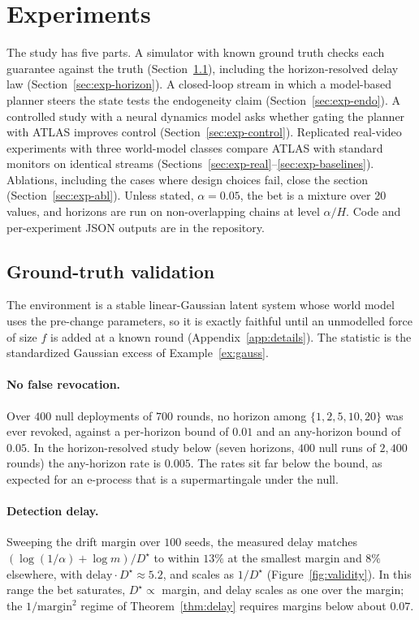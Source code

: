 \section{Experiments}\label{sec:experiments}

The study has five parts. A simulator with known ground truth checks each guarantee against the truth (Section~\ref{sec:exp-synth}), including
the horizon-resolved delay law (Section~\ref{sec:exp-horizon}). A closed-loop stream in which a model-based planner steers the state tests the endogeneity claim
(Section~\ref{sec:exp-endo}). A controlled study with a neural dynamics model asks whether gating the planner with ATLAS improves control (Section~\ref{sec:exp-control}).
Replicated real-video experiments with three world-model classes compare ATLAS with standard monitors on identical streams (Sections~\ref{sec:exp-real}--\ref{sec:exp-baselines}).
Ablations, including the cases where design choices fail, close the section (Section~\ref{sec:exp-abl}). Unless stated, $\alpha=0.05$, the bet is a mixture over 20 values, and
horizons are run on non-overlapping chains at level $\alpha/H$. Code and per-experiment JSON outputs are in the repository.

\subsection{Ground-truth validation}\label{sec:exp-synth}

The environment is a stable linear-Gaussian latent system whose world model uses the pre-change parameters, so it is exactly faithful until an unmodelled force of size $f$ is added at a known round
(Appendix~\ref{app:details}). The statistic is the standardized Gaussian excess of Example~\ref{ex:gauss}.

\paragraph{No false revocation.} Over $400$ null deployments of $700$ rounds, no horizon among $\{1,2,5,10,20\}$ was ever revoked, against a per-horizon bound of $0.01$ and an any-horizon bound of $0.05$.
In the horizon-resolved study below (seven horizons, $400$ null runs of $2{,}400$ rounds) the any-horizon rate is $0.005$. The rates sit far below the bound, as expected for an e-process that is a supermartingale under the null.

\paragraph{Detection delay.} Sweeping the drift margin over $100$ seeds, the measured delay matches $(\log(1/\alpha)+\log m)/D^\star$ to within $13\%$ at the smallest margin and $8\%$ elsewhere, with $\text{delay}\cdot D^\star\approx5.2$, and scales as $1/D^\star$ (Figure~\ref{fig:validity}).
In this range the bet saturates, $D^\star\propto$ margin, and delay scales as one over the margin; the $1/\text{margin}^2$ regime of Theorem~\ref{thm:delay} requires margins below about $0.07$.

